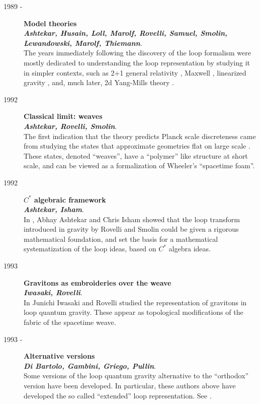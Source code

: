 \begin{description}
	\item[1989 - ] {\bf  Model theories\\
	{\em Ashtekar, Husain, Loll, Marolf, Rovelli, Samuel, Smolin, 
	Lewandowski, Marolf, Thiemann}}.\\
	The years immediately following the discovery of the loop 
	formalism were mostly dedicated to understanding 
	the loop representation by studying it in simpler contexts, 
	such as 2+1 general relativity 
	\cite{AshtekarEtAl89,Marolf93,AshtekarLoll}, Maxwell 
	\cite{AshtekarRovelli}, linearized gravity 
	\cite{AshtekarRovelliSmolin}, and, much later,  
	2d Yang-Mills theory \cite{ALMMT}.

	\item[1992] {\bf  Classical limit: weaves\\
	{\em Ashtekar, Rovelli, Smolin}}.\\
	The first indication that the theory predicts Planck scale 
	discreteness came from studying the states that approximate 
	geometries flat on large scale \cite{weave}.  These states, 
	denoted ``weaves'', have a ``polymer'' like structure at short 
	scale, and can be viewed as a formalization of Wheeler's 
	``spacetime foam''.

    \item[1992] {\bf  $C^{*}$ algebraic framework\\
	{\em Ashtekar, Isham}}.\\
	In \cite{AshtekarIsham}, Abhay Ashtekar and Chris Isham 
	showed that the loop transform introduced in gravity by 
	Rovelli and Smolin could be given a rigorous mathematical 
	foundation, and set the basis for a mathematical 
	systematization of the loop ideas, based on $C^{*}$ algebra 
	ideas.
		
	\item[1993] {\bf  Gravitons as embroideries over the weave\\
	{\em Iwasaki, Rovelli}}.\\
    In \cite{IwasakiRovelli} Junichi Iwasaki and Rovelli studied 
    the representation of gravitons in loop quantum gravity. 
    These appear as topological modifications of the fabric of 
    the spacetime weave. 

	\item[1993 - ] {\bf Alternative versions\\
	{\em Di Bartolo, Gambini, Griego, Pullin}}.\\
    Some versions of the loop quantum gravity alternative to the 
    ``orthodox'' version have been developed. In particular, these  
    authors above have developed the so called ``extended'' loop 
    representation. See \cite{Extended,Extended2}. 


\end{description}
